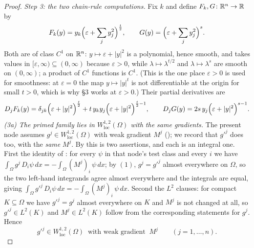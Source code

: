 \begin{proof}
\emph{Step 3: the two chain-rule computations.}  Fix $k$ and define
$F_k,G\colon\mathbb{R}^n\to\mathbb{R}$ by
\[
F_k(y)=y_k\Bigl(\varepsilon+\sum_jy_j^2\Bigr)^{\frac t2},
\qquad
G(y)=\Bigl(\varepsilon+\sum_jy_j^2\Bigr)^{s} .
\]
Both are of class $C^1$ on $\mathbb{R}^n$: $y\mapsto\varepsilon+|y|^2$ is a polynomial,
hence smooth, and takes values in $[\varepsilon,\infty)\subseteq(0,\infty)$
because $\varepsilon>0$, while $\lambda\mapsto\lambda^{t/2}$ and
$\lambda\mapsto\lambda^{s}$ are smooth on $(0,\infty)$; a product of $C^1$
functions is $C^1$.  (This is the one place $\varepsilon>0$ is used for
smoothness: at $\varepsilon=0$ the map $y\mapsto|y|^{t}$ is not differentiable at
the origin for small $t>0$, which is why \S3 works at $\varepsilon>0$.)  Their
partial derivatives are
\[
D_jF_k(y)=\delta_{jk}\Bigl(\varepsilon+|y|^2\Bigr)^{\frac t2}
+t\,y_ky_j\Bigl(\varepsilon+|y|^2\Bigr)^{\frac t2-1},
\qquad
D_jG(y)=2s\,y_j\Bigl(\varepsilon+|y|^2\Bigr)^{s-1} .
\]
\emph{(3a) The primed family lies in $W^{1,2}_{\mathrm{loc}}(\Omega)$ with the
same gradients.}  The present node assumes
$g^j\in W^{1,2}_{\mathrm{loc}}(\Omega)$ with weak gradient $M^j$
(); we record that $g'^j$ does too, with the \emph{same}
$M^j$.  By  this is two assertions, and each is an integral
one.  First the identity of : for every $\psi$ in
that node's test class and every $i$ we have
$\int_\Omega g^j\,D_i\psi\,dx=-\int_\Omega(M^j)_i\,\psi\,dx$; by $(1)$,
$g^j=g'^j$ almost everywhere on $\Omega$, so the two left-hand integrands agree
almost everywhere and the integrals are equal, giving
$\int_\Omega g'^j\,D_i\psi\,dx=-\int_\Omega(M^j)_i\,\psi\,dx$.  Second the
$L^2$ clauses: for compact $K\subseteq\Omega$ we have $g'^j=g^j$ almost
everywhere on $K$ and $M^j$ is not changed at all, so $g'^j\in L^2(K)$ and
$M^j\in L^2(K)$ follow from the corresponding statements for $g^j$.  Hence
\[
g'^j\in W^{1,2}_{\mathrm{loc}}(\Omega)\ \text{ with weak gradient }\ M^j
\qquad(j=1,\dots,n).
\tag{3a}
\]


\end{proof}
